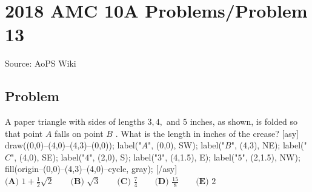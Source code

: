 \documentclass[12pt]{article}
\begin{document}
\section*{{2018 AMC 10A Problems/Problem 13}}
Source: AoPS Wiki

\subsection*{Problem}
A paper triangle with sides of lengths $3,4,$ and $5$ inches, as shown, is folded so that point $A$ falls on point $B$ . What is the length in inches of the crease? [asy] draw((0,0)--(4,0)--(4,3)--(0,0)); label("$A$", (0,0), SW); label("$B$", (4,3), NE); label("$C$", (4,0), SE); label("$4$", (2,0), S); label("$3$", (4,1.5), E); label("$5$", (2,1.5), NW); fill(origin--(0,0)--(4,3)--(4,0)--cycle, gray); [/asy] $\textbf{(A) } 1+\frac12 \sqrt2 \qquad \textbf{(B) } \sqrt3 \qquad \textbf{(C) } \frac74 \qquad \textbf{(D) } \frac{15}{8} \qquad \textbf{(E) } 2$
\end{document}

